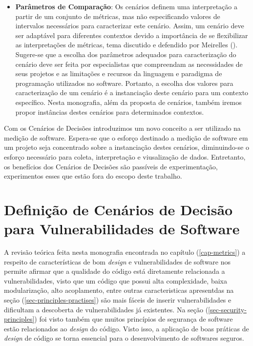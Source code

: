 \begin{itemize}
\item \textbf{Parâmetros de Comparação}: Os cenários definem uma interpretação a partir de um conjunto de métricas, mas não especificando valores de intervalos necessários para caracterizar este cenário. Assim, um cenário deve ser adaptável para diferentes contextos devido a importância de se flexibilizar as interpretações de métricas, tema discutido e defendido por Meirelles (\citeyear{meirelles2013metrics}). Sugere-se que a escolha dos parâmetros adequados para caracterização do cenário deve ser feita por especialistas que compreendam as necessidades de seus projetos e as limitações e recursos da linguagem e paradigma de programação utilizados no software. Portanto, a escolha dos valores para caracterização de um cenário é a instanciação deste cenário para um contexto específico. Nesta monografia, além da proposta de cenários, também iremos propor instâncias destes cenários para determinados contextos.
\end{itemize}

%

Com os Cenários de Decisões introduzimos um novo conceito a ser utilizado na medição de software. Espera-se que o esforço destinado a medição de software em um projeto seja concentrado sobre a instanciação destes cenários, diminuindo-se o esforço necessário para coleta, interpretação e viusalização de dados. Entretanto, os benefícios dos Cenários de Decisões são passíveis de experimentação, experimentos esses que estão fora do escopo deste trabalho.

%


%



\section{Definição de Cenários de Decisão para Vulnerabilidades de Software}

A revisão teórica feita nesta monografia encontrada no capítulo (\ref{cap-metrics}) a respeito de características de bom \emph{design} e vulnerabilidades de software nos permite afirmar que a qualidade do código está diretamente relacionada a vulnerabilidades, visto que um código que possui alta complexidade, baixa modularização, alto acoplamento, entre outras caracteristicas apresentdas na seção (\ref{sec-principles-practises}) são mais fáceis de inserir vulnerabilidades e dificultam a descoberta de vulnerabilidades já existentes. Na seção (\ref{sec-security-principles}) foi visto também que muitos princípios de segurança de software estão relacionados ao \emph{design} do código. Visto isso, a aplicação de boas práticas de \emph{design} de código se torna essencial para o desenvolvimento de softwares seguros.

